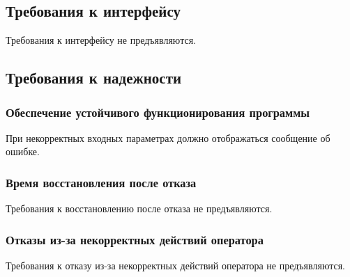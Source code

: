 \subsection{Требования к интерфейсу}
Требования к интерфейсу не предъявляются.


\subsection{Требования к надежности}
\subsubsection{Обеспечение устойчивого функционирования программы}
При некорректных входных параметрах должно отображаться сообщение об ошибке.
\subsubsection{Время восстановления после отказа}
Требования к восстановлению после отказа не предъявляются.
\subsubsection{Отказы из-за некорректных действий оператора}
Требования к отказу из-за некорректных действий оператора не предъявляются.
